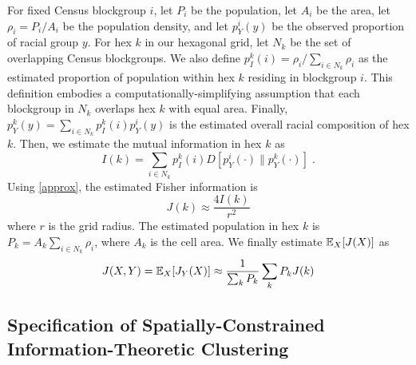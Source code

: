 	For fixed Census blockgroup $i$, let $P_i$ be the population, let $A_i$ be the area, let $\rho_i = P_i / A_i$ be the population density, and let $p^i_Y(y)$ be the observed proportion of racial group $y$. For hex $k$ in our hexagonal grid, let $N_k$ be the set of overlapping Census blockgroups. We also define $p^{k}_I(i) = \rho_i / \sum_{i \in N_k} \rho_i$ as the estimated proportion of population within hex $k$ residing in blockgroup $i$. This definition embodies a computationally-simplifying assumption that each blockgroup in $N_k$ overlaps hex $k$ with equal area. Finally, $p^k_Y(y) = \sum_{i \in N_k} p^{k}_I(i) p^i_Y(y)$ is the estimated overall racial composition of hex $k$. Then, we estimate the mutual information in hex $k$ as 
	\begin{equation}
		I(k) = \sum_{i \in N_k} p^k_I(i) D[p^i_Y(\cdot) \| p^k_Y(\cdot)]\;. 
	\end{equation}
	Using \eqref{approx}, the estimated Fisher information is 
	\begin{equation}
		J(k) \approx \frac{4 I(k)}{r^2}
	\end{equation}
	where $r$ is the grid radius. The estimated population in hex $k$ is $P_k = A_k\sum_{i \in N_k} \rho_i$, where $A_k$ is the cell area. We finally estimate $\mathbb{E}_X[J(X)]$ as 
	\begin{equation}
		J(X,Y) = \mathbb{E}_X[J_Y(X)] \approx \frac{1}{\sum_k P_k} \sum_k P_k J(k)
	\end{equation}

\subsection{Specification of Spatially-Constrained Information-Theoretic Clustering}
